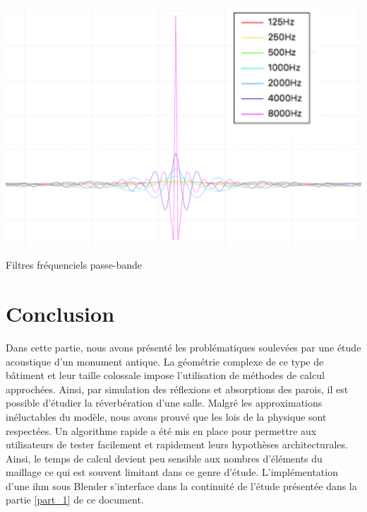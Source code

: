 \begin{figureth}
	\includegraphics[width=0.9\linewidth]{images/filtres}
	\caption{Filtres fréquenciels passe-bande}
	\label{filtres}
\end{figureth}




	
\chapter*{Conclusion}

Dans cette partie, nous avons présenté les problématiques soulevées par une étude acoustique d'un monument antique. La géométrie complexe de ce type de bâtiment et leur taille colossale impose l'utilisation de méthodes de calcul approchées. Ainsi, par simulation des réflexions et absorptions des parois, il est possible d'étudier la réverbération d'une salle. Malgré les approximations inéluctables du modèle, nous avons prouvé que les lois de la physique sont respectées. Un algorithme rapide a été mis en place pour permettre aux utilisateurs de tester facilement et rapidement leurs hypothèses architecturales. Ainsi, le temps de calcul devient peu sensible aux nombres d'éléments du maillage ce qui est souvent limitant dans ce genre d'étude. L'implémentation d'une \gls{ihm} sous Blender s'interface dans la continuité de l'étude présentée dans la partie \ref{part_1} de ce document. 

